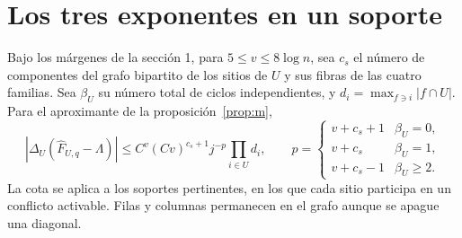 \section{Los tres exponentes en un soporte}
\begin{proposicion}\label{prop:s}
Bajo los márgenes de la sección 1, para \(5\le v\le8\log n\), sea \(c_s\) el número
de componentes del grafo bipartito de los sitios de \(U\) y sus fibras de las cuatro
familias. Sea \(\beta_U\) su número total de ciclos independientes, y
\(d_i=\max_{f\ni i}|f\cap U|\). Para el aproximante de la proposición~\ref{prop:m},
\[
 \left|\Delta_U(\widehat F_{U,q}-\Lambda)\right|
 \le C^v(Cv)^{c_s+1}j^{-p}\prod_{i\in U}d_i,\qquad
 p=\begin{cases}
 v+c_s+1 & \beta_U=0,\\
 v+c_s & \beta_U=1,\\
 v+c_s-1 & \beta_U\ge2 .
 \end{cases}
\]
La cota se aplica a los soportes pertinentes, en los que cada sitio participa en un
conflicto activable. Filas y columnas permanecen en el grafo aunque se apague una diagonal.
\end{proposicion}
